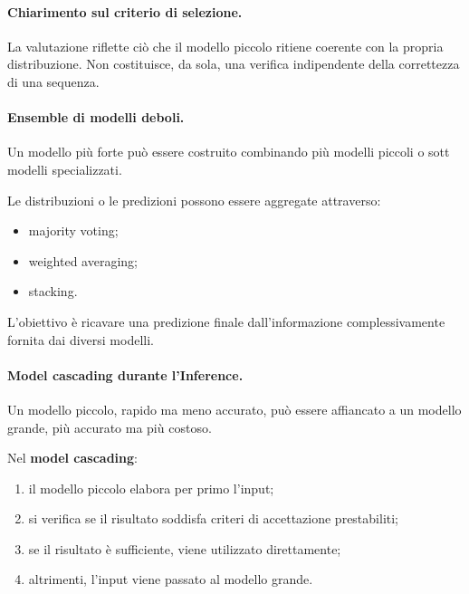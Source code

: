 \paragraph{Chiarimento sul criterio di selezione.}
La valutazione riflette ciò che il modello piccolo
ritiene coerente con la propria distribuzione.
Non costituisce, da sola,
una verifica indipendente della correttezza
di una sequenza.

\paragraph{Ensemble di modelli deboli.}
Un modello più forte può essere costruito
combinando più modelli piccoli
o sott modelli specializzati.

Le distribuzioni o le predizioni
possono essere aggregate attraverso:

\begin{itemize}
    \item majority voting;

    \item weighted averaging;

    \item stacking.
\end{itemize}

L'obiettivo è ricavare una predizione finale
dall'informazione complessivamente fornita
dai diversi modelli.

\paragraph{Model cascading durante l'Inference.}
Un modello piccolo, rapido ma meno accurato,
può essere affiancato a un modello grande,
più accurato ma più costoso.

Nel \textbf{model cascading}:

\begin{enumerate}
    \item il modello piccolo elabora per primo l'input;

    \item si verifica se il risultato soddisfa
    criteri di accettazione prestabiliti;

    \item se il risultato è sufficiente,
    viene utilizzato direttamente;

    \item altrimenti, l'input viene passato
    al modello grande.
\end{enumerate}


